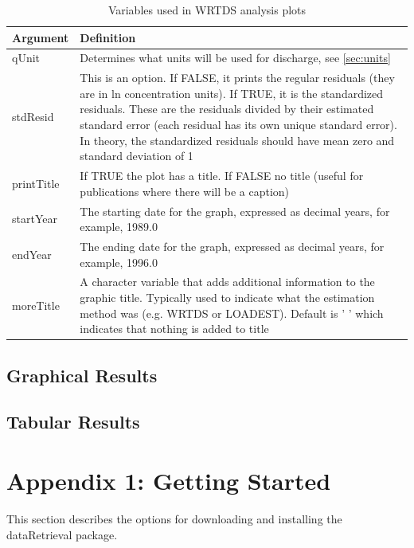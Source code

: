 \documentclass[a4paper,11pt]{article}
\begin{document}
\begin{table}
\caption{Variables used in WRTDS analysis plots  \label{tab:wrtdsVariables}}
\begin{tabularx}{\textwidth}{lX}
\hline
  \textbf{Argument} & \textbf{Definition} \\
\hline
qUnit & Determines what units will be used for discharge, see \ref{sec:units}\\
stdResid & This is an option.  If FALSE, it prints the regular residuals (they are in ln concentration units).  If TRUE, it is the standardized residuals.  These are the residuals divided by their estimated standard error (each residual has its own unique standard error).  In theory, the standardized residuals should have mean zero and standard deviation of 1 \\
printTitle & If TRUE the plot has a title.  If FALSE no title (useful for publications where there will be a caption) \\
startYear & The starting date for the graph, expressed as decimal years, for example, 1989.0 \\
endYear & The ending date for the graph, expressed as decimal years, for example, 1996.0 \\
moreTitle & A character variable that adds additional information to the graphic title.  Typically used to indicate what the estimation method was (e.g. WRTDS or LOADEST).  Default is ' ' which indicates that nothing is added to title \\
\hline
\end{tabularx}

\end{table}

\FloatBarrier
\subsection{Graphical Results}
\label{sec:wrtdsPlotting}

\subsection{Tabular Results}
\label{sec:wrtdsTable}

\newpage
\appendix
\section{Appendix 1: Getting Started}
\label{sec:appendix1}
This section describes the options for downloading and installing the dataRetrieval package.
\end{document}
